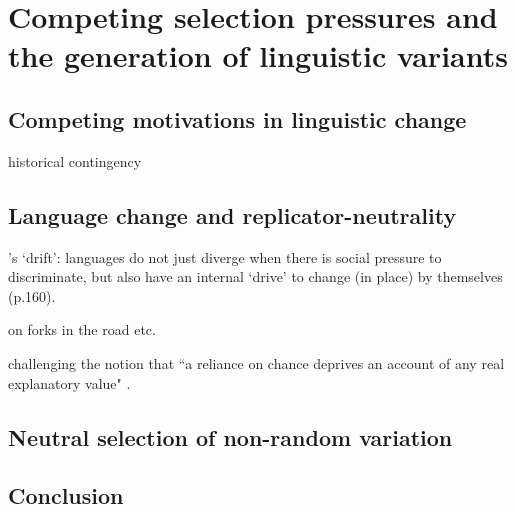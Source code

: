 \chapter[Asymmetric generation of variants]{Competing selection pressures and the generation of linguistic variants}


\section{Competing motivations in linguistic change}


historical contingency~\citep[p.503]{Labov2001} %

\section{Language change and replicator-neutrality}

\citet{Sapir1921}'s `drift': languages do not just diverge when there is social pressure to discriminate, but also have an internal `drive' to change (in place) by themselves (p.160).

\citep[ch.7-12]{Labov2010} on forks in the road etc.

challenging the notion that ``a reliance on chance deprives an account of any real explanatory value" \citep[p.44]{Joseph2013}.

\section{Neutral selection of non-random variation}




\section{Conclusion}
